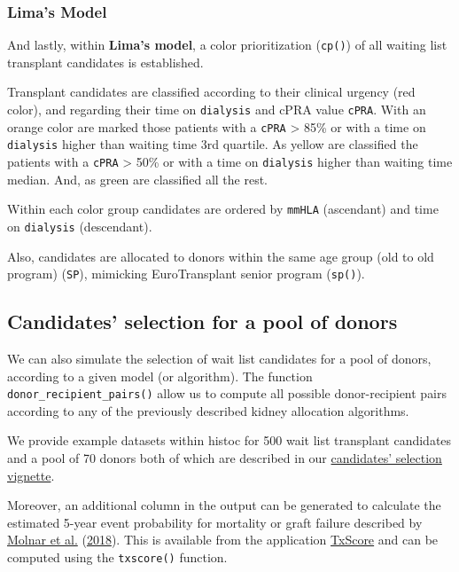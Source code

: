\documentclass[
]{article}
\begin{document}
\hypertarget{limas-model}{%
\subsubsection{Lima's Model}\label{limas-model}}

And lastly, within \textbf{Lima's model}, a color prioritization
(\texttt{cp()}) of all waiting list transplant candidates is
established.

Transplant candidates are classified according to their clinical urgency
(red color), and regarding their time on \texttt{dialysis} and cPRA
value \texttt{cPRA}. With an orange color are marked those patients with
a \texttt{cPRA} \textgreater{} 85\% or with a time on \texttt{dialysis}
higher than waiting time 3rd quartile. As yellow are classified the
patients with a \texttt{cPRA} \textgreater{} 50\% or with a time on
\texttt{dialysis} higher than waiting time median. And, as green are
classified all the rest.

Within each color group candidates are ordered by \texttt{mmHLA}
(ascendant) and time on \texttt{dialysis} (descendant).

Also, candidates are allocated to donors within the same age group (old
to old program) (\texttt{SP}), mimicking EuroTransplant senior program
(\texttt{sp()}).

\hypertarget{candidates-selection-for-a-pool-of-donors}{%
\subsection{Candidates' selection for a pool of
donors}\label{candidates-selection-for-a-pool-of-donors}}

We can also simulate the selection of wait list candidates for a pool of
donors, according to a given model (or algorithm). The function
\texttt{donor\_recipient\_pairs()} allow us to compute all possible
donor-recipient pairs according to any of the previously described
kidney allocation algorithms.

We provide example datasets within histoc for 500 wait list transplant
candidates and a pool of 70 donors both of which are described in our
\href{https://txopen.github.io/histoc/articles/cand_select.html}{candidates'
selection vignette}.

Moreover, an additional column in the output can be generated to
calculate the estimated 5-year event probability for mortality or graft
failure described by \protect\hyperlink{ref-Molnar:2018}{Molnar et al.}
(\protect\hyperlink{ref-Molnar:2018}{2018}). This is available from the
application \href{https://balima.shinyapps.io/scoreTx/}{TxScore} and can
be computed using the \texttt{txscore()} function.
\end{document}
